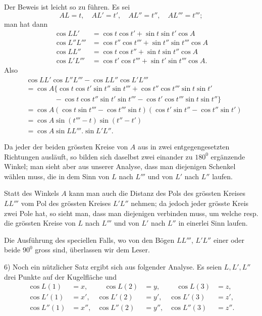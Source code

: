\par{}%
\noindent\hspace*{1.2em}Der Beweis ist leicht so zu führen. Es sei
\[
AL=t,\quad AL'=t',\quad AL''=t'',\quad AL'''=t''';
\]
man hat dann
\[
\begin{aligned}
\cos LL'&=\cos t\cos t'+\sin t\sin t'\cos A\\
\cos L''L'''&=\cos t''\cos t'''+\sin t''\sin t'''\cos A\\
\cos LL''&=\cos t\cos t''+\sin t\sin t''\cos A\\
\cos L'L'''&=\cos t'\cos t'''+\sin t'\sin t'''\cos A.
\end{aligned}
\]
Also
\[
\begin{aligned}
&\cos LL'\cos L''L'''-\cos LL''\cos L'L'''\\
&=\cos A\{\cos t\cos t'\sin t''\sin t'''+\cos t''\cos t'''\sin t\sin t'\\
&\qquad\qquad-\cos t\cos t''\sin t'\sin t'''-\cos t'\cos t'''\sin t\sin t''\}\\
&=\cos A(\cos t\sin t'''-\cos t'''\sin t)(\cos t'\sin t''-\cos t''\sin t')\\
&=\cos A\sin(t'''-t)\sin(t''-t')\\
&=\cos A\sin LL'''.\sin L'L''.
\end{aligned}
\]

Da jeder der beiden grössten Kreise von $A$ aus in zwei entgegengesetzten Richtungen ausläuft, so bilden sich daselbst zwei einander zu $180^{0}$ ergänzende Winkel; man sieht aber aus unserer Analyse, dass man diejenigen Schenkel wählen muss, die in dem Sinn von $L$ nach $L'''$ und von $L'$ nach $L''$ laufen.

Statt des Winkels $A$ kann man auch die Distanz des Pols des grössten Kreises $LL'''$ vom Pol des grössten Kreises $L'L''$ nehmen; da jedoch jeder grösste Kreis zwei Pole hat, so sieht man, dass man diejenigen verbinden muss, um welche resp. die grössten Kreise von $L$ nach $L'''$ und von $L'$ nach $L''$ in einerlei Sinn laufen.

Die Ausführung des speciellen Falls, wo von den Bögen $LL'''$, $L'L''$ einer oder beide $90^{0}$ gross sind, überlassen wir dem Leser.

6) Noch ein nützlicher Satz ergibt sich aus folgender Analyse. Es seien $L,L',L''$ drei Punkte auf der Kugelfläche und
\[
\begin{aligned}
\cos L(1)&=x,&\quad\cos L(2)&=y,&\quad\cos L(3)&=z,\\
\cos L'(1)&=x',&\cos L'(2)&=y',&\cos L'(3)&=z',\\
\cos L''(1)&=x'',&\cos L''(2)&=y'',&\cos L''(3)&=z''.
\end{aligned}
\]

